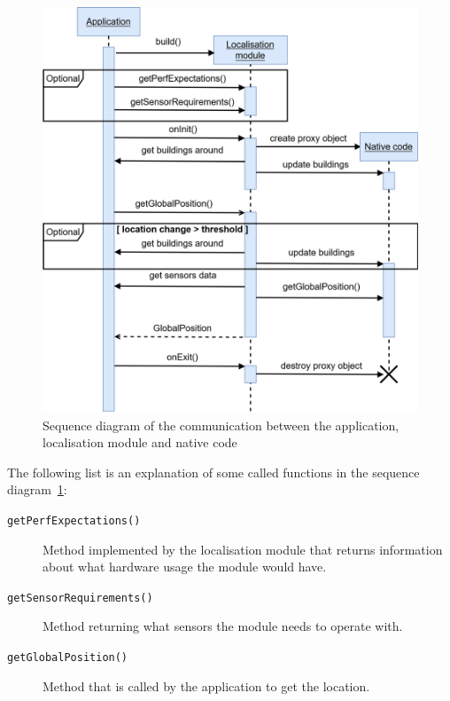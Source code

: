 \documentclass[thesis=B,english]{FITthesis}[2019/12/23]
\begin{document}
        \begin{figure}
            \centering
            \includegraphics[width = 1\linewidth]{pictures/future/sequenceDiagram2.png}
            \caption{Sequence diagram of the communication between the application, localisation module and native code}
            \label{fig:sequenceDiagram}
        \end{figure}
        The following list is an explanation of some called functions in the sequence diagram~\ref{fig:sequenceDiagram}:
        \begin{description}
            \item[\texttt{getPerfExpectations()}] Method implemented by the localisation module that returns information about what hardware usage the module would have.
            \item[\texttt{getSensorRequirements()}] Method returning what sensors the module needs to operate with.
            \item[\texttt{getGlobalPosition()}] Method that is called by the application to get the location.
        \end{description}
        
\end{document}
